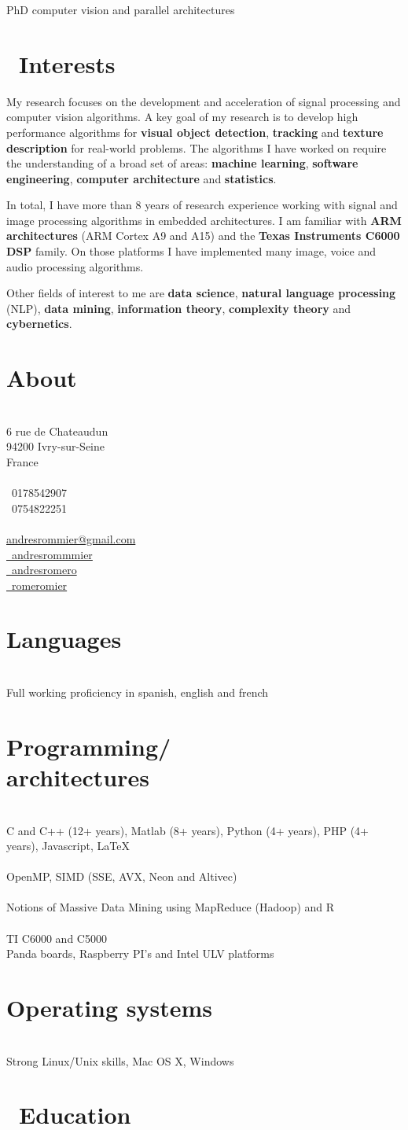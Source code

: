 \documentclass[]{friggeri-cv}
\makeatletter
\def\twitter{{\FA \faTwitter}}
\def\github{{\FA \faGithub}}
\def\linkedin{{\FA \faLinkedin}}
\def\envelope{{\FA \faEnvelopeAlt}}
\def\phone{{\FA \faPhone}}
\def\mobilePhone{{\FA \faMobilePhone}}
\def\flask{{\FA \faFlask}}
\def\pencil{{\FA \faPencil}}
\newcommand{\printaside}{
  \begin{aside}
    \section{About}
      \\
      {6 rue de Chateaudun\\
        94200 Ivry-sur-Seine\\
        France\\
        ~\\
        \phone\ 0178542907\\
        \mobilePhone\ 0754822251\\
        ~\\
        \href{mailto:andresrommier@gmail.com}{\envelope andresrommier@gmail.com}\\
        \href{http://twitter.com/andresrommier}{\twitter\ andresrommmier}\\
        \href{http://andresromero.github.com}{\github\ andresromero}\\
        \href{https://www.linkedin.com/in/romeromier}{\linkedin\ romeromier}}\\
    \section{Languages}\\
      {Full working proficiency in spanish, english and french}\\
    \section{Programming/ \\ architectures}\\
      {C and C++ (12+ years), Matlab (8+ years), Python (4+ years), PHP (4+ years), Javascript, {\stdfont \LaTeX} }\\
      ~\\
      {OpenMP, SIMD (SSE, AVX, Neon and Altivec)}\\
      ~\\
      {Notions of Massive Data Mining using MapReduce (Hadoop) and R}\\
      ~\\
      {TI C6000 and C5000}\\
      {Panda boards, Raspberry PI's and Intel ULV platforms}\\
    \section{Operating systems}\\
      {Strong Linux/Unix skills, Mac OS X, Windows}\\
  \end{aside}
}
\makeatother
\begin{document}
       {PhD computer vision and parallel architectures}


\section{{\flask}\ Interests}

My research focuses on the development and acceleration of signal processing and computer vision algorithms. A key goal of my research is to develop high performance algorithms for \textbf{visual object detection}, \textbf{tracking} and \textbf{texture description} for real-world problems. The algorithms I have worked on require the understanding of a broad set of areas: \textbf{machine learning}, \textbf{software engineering}, \textbf{computer architecture} and \textbf{statistics}.

In total, I have more than 8 years of research experience working with signal and image processing algorithms in embedded architectures. I am familiar with \textbf{ARM architectures} (ARM Cortex A9 and A15) and the \textbf{Texas Instruments C6000 DSP} family. On those platforms I have implemented many image, voice and audio processing algorithms.

Other fields of interest to me are \textbf{data science}, \textbf{natural language processing} (NLP), \textbf{data mining}, \textbf{information theory}, \textbf{complexity theory} and \textbf{cybernetics}.

\printaside

\section{{\pencil}\ Education}
\end{document}
